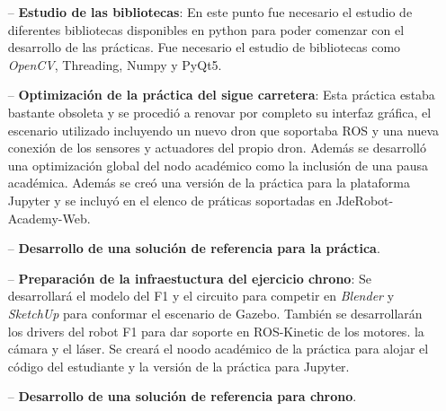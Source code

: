 \begin{itemize}
\begin{figure}[H]
\begin{minipage}[H]{.48\linewidth}
		\label{fig:warehouserobot}
	\end{minipage}
\end{figure}
	\item[--] \textbf{Estudio de las bibliotecas}: En este punto fue necesario el estudio de diferentes bibliotecas disponibles en python para poder comenzar con el desarrollo de las prácticas. Fue necesario el estudio de bibliotecas como \textit{OpenCV}, Threading, Numpy y PyQt5.
	\item[--] \textbf{Optimización de la práctica del sigue carretera}: Esta práctica estaba bastante obsoleta y se procedió a renovar por completo su interfaz gráfica, el escenario utilizado incluyendo un nuevo dron que soportaba ROS y una nueva conexión de los sensores y actuadores del propio dron. Además se desarrolló una optimización global del nodo académico como la inclusión de una pausa académica. Además se creó una versión de la práctica para la plataforma Jupyter y se incluyó en el elenco de práticas soportadas en JdeRobot-Academy-Web.
	\item[--] \textbf{Desarrollo de una solución de referencia para la práctica}.
	\item[--] \textbf{Preparación de la infraestuctura del ejercicio chrono}: Se desarrollará el modelo del F1 y el circuito para competir en \textit{Blender} y \textit{SketchUp} para conformar el escenario de Gazebo. También se desarrollarán los drivers del robot F1 para dar soporte en ROS-Kinetic de los motores. la cámara y el láser. Se creará el noodo académico de la práctica para alojar el código del estudiante y la versión de la práctica para Jupyter.
	\item[--] \textbf{Desarrollo de una solución de referencia para chrono}.
\end{itemize}